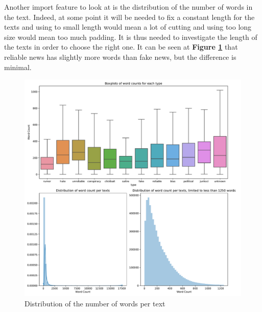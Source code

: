 Another import feature to look at is the distribution of the number of words in the text. Indeed, at some point it will be needed to fix a constant length for the texts and using to small length would mean a lot of cutting and using too long size would mean too much padding. It is thus needed to investigate the length of the texts in order to choose the right one. It can be seen at \textbf{Figure \ref{fig:data_explo:fake_corps_summary1}} that reliable news has slightly more words than fake news, but the difference is minimal. \\
\begin{figure}[!ht]
  \centering
  \includegraphics[width=\textwidth]{images/data_exploration/fake_corpus_summary1.pdf}
  \caption{Distribution of the number of words per text}
  \label{fig:data_explo:fake_corps_summary1}
\end{figure}


